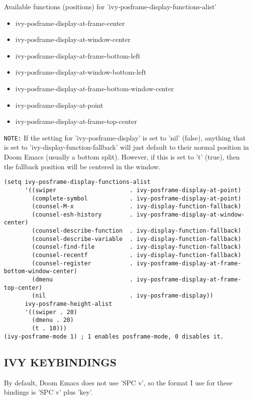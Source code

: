 \documentclass[11pt]{article}
\begin{document}
Available functions (positions) for 'ivy-posframe-display-functions-alist'
\begin{itemize}
\item ivy-posframe-display-at-frame-center
\item ivy-posframe-display-at-window-center
\item ivy-posframe-display-at-frame-bottom-left
\item ivy-posframe-display-at-window-bottom-left
\item ivy-posframe-display-at-frame-bottom-window-center
\item ivy-posframe-display-at-point
\item ivy-posframe-display-at-frame-top-center
\end{itemize}

\texttt{NOTE:} If the setting for 'ivy-posframe-display' is set to 'nil' (false), anything that is set to 'ivy-display-function-fallback' will just default to their normal position in Doom Emacs (usually a bottom split).  However, if this is set to 't' (true), then the fallback position will be centered in the window.

\begin{verbatim}
(setq ivy-posframe-display-functions-alist
      '((swiper                     . ivy-posframe-display-at-point)
        (complete-symbol            . ivy-posframe-display-at-point)
        (counsel-M-x                . ivy-display-function-fallback)
        (counsel-esh-history        . ivy-posframe-display-at-window-center)
        (counsel-describe-function  . ivy-display-function-fallback)
        (counsel-describe-variable  . ivy-display-function-fallback)
        (counsel-find-file          . ivy-display-function-fallback)
        (counsel-recentf            . ivy-display-function-fallback)
        (counsel-register           . ivy-posframe-display-at-frame-bottom-window-center)
        (dmenu                      . ivy-posframe-display-at-frame-top-center)
        (nil                        . ivy-posframe-display))
      ivy-posframe-height-alist
      '((swiper . 20)
        (dmenu . 20)
        (t . 10)))
(ivy-posframe-mode 1) ; 1 enables posframe-mode, 0 disables it.
\end{verbatim}

\subsection{IVY KEYBINDINGS}
\label{sec:orgc69867c}
By default, Doom Emacs does not use 'SPC v', so the format I use for these bindings is 'SPC v' plus 'key'.
\end{document}
